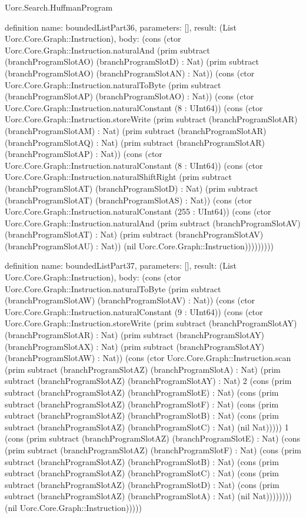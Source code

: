 \begin{lexlean}{Uorc.Search.HuffmanProgram}
\begin{semanticmodule}
definition{
  name: boundedListPart36,
  parameters: [],
  result: (List Uorc.Core.Graph::Instruction),
  body: (cons (ctor Uorc.Core.Graph::Instruction.naturalAnd (prim subtract (branchProgramSlotAO) (branchProgramSlotD) : Nat) (prim subtract (branchProgramSlotAO) (branchProgramSlotAN) : Nat)) (cons (ctor Uorc.Core.Graph::Instruction.naturalToByte (prim subtract (branchProgramSlotAP) (branchProgramSlotAO) : Nat)) (cons (ctor Uorc.Core.Graph::Instruction.naturalConstant (8 : UInt64)) (cons (ctor Uorc.Core.Graph::Instruction.storeWrite (prim subtract (branchProgramSlotAR) (branchProgramSlotAM) : Nat) (prim subtract (branchProgramSlotAR) (branchProgramSlotAQ) : Nat) (prim subtract (branchProgramSlotAR) (branchProgramSlotAP) : Nat)) (cons (ctor Uorc.Core.Graph::Instruction.naturalConstant (8 : UInt64)) (cons (ctor Uorc.Core.Graph::Instruction.naturalShiftRight (prim subtract (branchProgramSlotAT) (branchProgramSlotD) : Nat) (prim subtract (branchProgramSlotAT) (branchProgramSlotAS) : Nat)) (cons (ctor Uorc.Core.Graph::Instruction.naturalConstant (255 : UInt64)) (cons (ctor Uorc.Core.Graph::Instruction.naturalAnd (prim subtract (branchProgramSlotAV) (branchProgramSlotAT) : Nat) (prim subtract (branchProgramSlotAV) (branchProgramSlotAU) : Nat)) (nil Uorc.Core.Graph::Instruction)))))))))
}

definition{
  name: boundedListPart37,
  parameters: [],
  result: (List Uorc.Core.Graph::Instruction),
  body: (cons (ctor Uorc.Core.Graph::Instruction.naturalToByte (prim subtract (branchProgramSlotAW) (branchProgramSlotAV) : Nat)) (cons (ctor Uorc.Core.Graph::Instruction.naturalConstant (9 : UInt64)) (cons (ctor Uorc.Core.Graph::Instruction.storeWrite (prim subtract (branchProgramSlotAY) (branchProgramSlotAR) : Nat) (prim subtract (branchProgramSlotAY) (branchProgramSlotAX) : Nat) (prim subtract (branchProgramSlotAY) (branchProgramSlotAW) : Nat)) (cons (ctor Uorc.Core.Graph::Instruction.scan (prim subtract (branchProgramSlotAZ) (branchProgramSlotA) : Nat) (prim subtract (branchProgramSlotAZ) (branchProgramSlotAY) : Nat) 2 (cons (prim subtract (branchProgramSlotAZ) (branchProgramSlotE) : Nat) (cons (prim subtract (branchProgramSlotAZ) (branchProgramSlotF) : Nat) (cons (prim subtract (branchProgramSlotAZ) (branchProgramSlotB) : Nat) (cons (prim subtract (branchProgramSlotAZ) (branchProgramSlotC) : Nat) (nil Nat))))) 1 (cons (prim subtract (branchProgramSlotAZ) (branchProgramSlotE) : Nat) (cons (prim subtract (branchProgramSlotAZ) (branchProgramSlotF) : Nat) (cons (prim subtract (branchProgramSlotAZ) (branchProgramSlotB) : Nat) (cons (prim subtract (branchProgramSlotAZ) (branchProgramSlotC) : Nat) (cons (prim subtract (branchProgramSlotAZ) (branchProgramSlotD) : Nat) (cons (prim subtract (branchProgramSlotAZ) (branchProgramSlotA) : Nat) (nil Nat)))))))) (nil Uorc.Core.Graph::Instruction)))))
}


\end{semanticmodule}
\end{lexlean}
